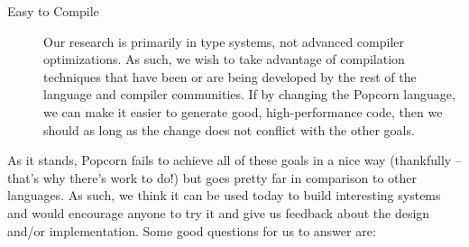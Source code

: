 \documentclass[titlepage,10pt]{article}
\begin{document}
\begin{description}
\item [Easy to Compile] Our research is primarily in type systems, not
advanced compiler optimizations.  As such, we wish to take advantage of
compilation techniques that have been or are being developed by the rest
of the language and compiler communities.  If by changing the Popcorn
language, we can make it easier to generate good, high-performance code,
then we should as long as the change does not conflict with the other
goals.

\end{description}


As it stands, Popcorn fails to achieve all of these goals in a nice way
(thankfully -- that's why there's work to do!) but goes pretty far in
comparison to other languages.   As such, we think it can be used today
to build interesting systems and would encourage anyone to try it and
give us feedback about the design and/or implementation.   Some good
questions for us to answer are: 
\end{document}
